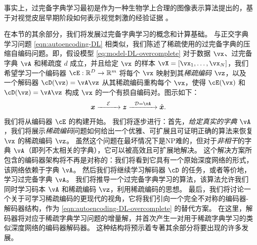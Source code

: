 \documentclass[../../book-main.tex]{subfiles}
\begin{document}
事实上，过完备字典学习最初是作为一种生物学上合理的图像表示算法提出的，基于对视觉皮层早期阶段如何表示视觉刺激的经验证据 \cite{Olshausen1996-ap,Olshausen1997-yv}。

在本节的其余部分，我们将发展过完备字典学习的概念和计算基础。
与正交字典学习问题 \eqref{eqn:autoencoding-DL} 相类似，我们陈述了稀疏使用的过完备字典的压缩自编码问题。即，假设模型 \eqref{eq:model-DL-overcomplete} 对于数据 \(\vx\)、过完备字典 \(\vA\) 和稀疏度 \(d\) 成立，并且给定 \(\vx\) 的样本 \(\vX = [\vx_1, \dots, \vx_N]\)，我们希望学习一个编码器 \(\cE : \R^D \to \R^m\) 将每个 \(\vx\) 映射到其\textit{稀疏编码} \(\vz\)，以及一个解码器 \(\cD(\vz) = \vA \vz\) 从其稀疏编码重构每个 \(\vx\)，使得 \(\cE(\vx)\) 和 \(\cD(\vz) = \vA\vz\) 构成 \(\vx\) 的一个有损自编码对。图示如下：
\begin{equation}
\x \xrightarrow{\hspace{4mm} \mathcal{E} \hspace{4mm}}  \z \xrightarrow{\hspace{2mm} \mathcal{D} = \vA \hspace{2mm}}   \hat{\x}.  
\label{eqn:autoencoding-DL-overcomplete}
\end{equation}    
我们将从编码器 $\cE$ 的构建开始。
我们将逐步进行：首先，\textit{给定真实的字典 $\vA$}，我们将展示\textit{稀疏编码}问题如何给出一个优雅、可扩展且可证明正确的算法来恢复 $\vx$ 的稀疏编码 $\vz$。
虽然这个问题在最坏情况下是NP难的，但对于\textit{非相干}的字典 $\vA$（即列不太相关的字典），它可以被高效且可扩展地解决。
这个解决方案所包含的编码器架构将不再是对称的：我们将看到它具有一个原始深度网络的形式，该网络依赖于字典 $\vA$。
然后我们将继续学习解码器 $\cD$ 的任务，或者等价地，学习过完备字典 $\vA$。
我们将推导一个过完备字典学习的算法，该算法允许我们
同时学习码本 $\vA$ 和稀疏编码 $\vz$，利用稀疏编码的思想。
最后，我们将讨论一个关于可学习稀疏编码的更现代的视角，它将我们引向一个完全不对称的编码器-解码器结构，作为 \eqref{eqn:autoencoding-DL-overcomplete} 的替代方案。
在这里，解码器将对应于稀疏字典学习问题的增量解，并首次产生一对用于稀疏字典学习的类似深度网络的编码器解码器。
这种结构将预示着专著其余部分将要出现的许多发展。
\end{document}
